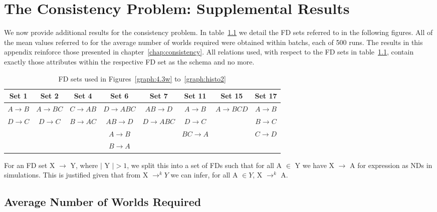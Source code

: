 \chapter{The Consistency Problem: Supplemental Results}

We now provide additional results for the consistency problem. In
table~\ref{tbl:fd_set_used} we detail the FD sets referred to in the
following figures. All of the mean values referred to for the average
number of worlds required were obtained within batchs, each of 500
runs. The results in this appendix reinforce those presented in
chapter~\ref{chap:consistency}.  All relations used, with respect to the
FD sets in table~\ref{tbl:fd_set_used}, contain exactly those
attributes within the respective FD set as the schema and no more. 


{
\line
\begin{table}[ht]
\small{
\begin{center}
\begin{tabular}{|c||c||c||c||c||c||c||c|}
\hline
{\bf Set 1} & {\bf Set 2} 	& {\bf Set 4} 	& {\bf Set 6} & {\bf Set 7}	& { \bf Set 11} & {\bf Set 15}	& {\bf Set 17} \\ \hline \hline
$A \to B$ &	$A \to BC$	&  $C \to AB$	&  $D \to ABC$ & $AB \to D$ 	& $A \to B$ 	&$A \to BCD$	& $A \to B$ \\
$D \to C$ &	$D \to C$     &  $B \to AC$	&  $AB \to D$ & $D\to ABC$ 	& $D \to C$ &		& $B \to C$ \\
	&			&  		&  $A \to B$ & & $BC \to A$ &		& $C \to D$  \\
	&			&  		&  $B \to A$ & &  		&	&  \\\hline
\end{tabular}
\end{center}
}
\caption{\label{tbl:fd_set_used} FD sets used in
Figures~\ref{graph:4.3w} to~\ref{graph:histo2}}
\end{table}
}

For an FD set X $\to$ Y, where $\mid$ Y $\mid > 1$, we split this into
a set of FDs such that for all A $\in$ Y we have X $\to$ A for
expression as NDs in simulations.  This is justified given that from X
$\to^k Y$ we can infer, for all A $\in Y$, X $\to^k$ A.

\section{Average Number of Worlds Required}


